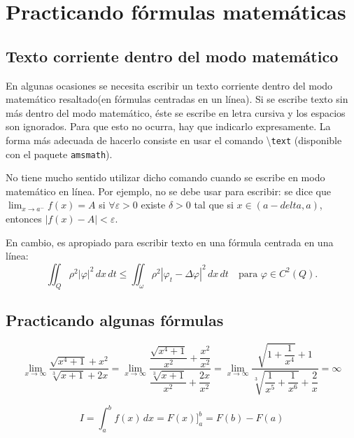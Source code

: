 \documentclass[11pt,a4paper]{report}
\begin{document}
\chapter{Practicando fórmulas matemáticas}
\section{Texto corriente dentro del modo matemático}
En algunas ocasiones se necesita escribir un texto corriente dentro del modo matemático resaltado(en fórmulas centradas en un línea). Si se escribe texto sin más dentro del modo matemático, éste se escribe en letra cursiva y los espacios son ignorados. Para que esto no ocurra, hay que indicarlo expresamente. La forma más adecuada de hacerlo consiste en usar el comando \textbackslash\texttt{text} (disponible con el paquete \texttt{amsmath}).

No tiene mucho sentido utilizar dicho comando cuando se escribe en modo matemático en línea. Por ejemplo, no se debe usar para escribir: se dice que $\lim_{x\to a^{-}}f(x)=A$ si 
$\forall \varepsilon > 0$ existe 
$\delta > 0$ tal que si 
$x \in (a-delta,a)$, entonces 
$|f(x)-A|<\varepsilon$.

En cambio, es apropiado para escribir texto en una fórmula centrada en una línea:
%
\begin{equation}
\iint_{Q}\rho^2|\varphi|^2\,dx\,dt \leq \iint_{\omega}\rho^2|\varphi_{t}-\Delta\varphi|^2\,dx\,dt \quad \text{para }  \varphi \in C^2(Q). 
\end{equation}


\section{Practicando algunas fórmulas}

\begin{equation*}
\lim_{x \to \infty}\dfrac{\sqrt{x^4+1}+x^2}{\sqrt[3]{x+1}+2x}=
%
\lim_{x \to \infty}\dfrac{\dfrac{\sqrt{x^4+1}}{x^2}+\dfrac{x^2}{x^2}}{\dfrac{\sqrt[3]{x+1}}{x^2}+\dfrac{2x}{x^2}} =
%
\lim_{x \to \infty}\dfrac{\sqrt{1+\dfrac{1}{x^4}}+1}{\sqrt[3]{\dfrac{1}{x^5}+\dfrac{1}{x^6}}+\dfrac{2}{x}} =
\infty
\end{equation*}

\begin{equation*}
I=\int_{a}^{b}f(x)\,dx=F(x)\bigg]_{a}^{b}=F(b)-F(a)
\end{equation*}
\end{document}
